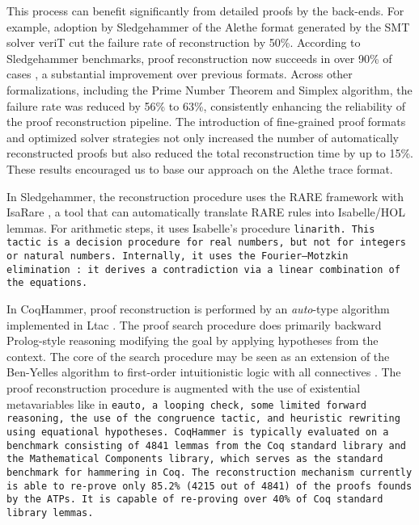 This process can benefit significantly from detailed proofs by the back-ends.
For example, adoption by Sledgehammer of the Alethe format generated by the SMT solver veriT \cite{isabelle1,isabelle2} cut the failure rate of reconstruction by 50\%.
According to Sledgehammer benchmarks, proof reconstruction now succeeds in over 90\% of cases \cite{verit-recon, SledgehammerReconImprove}, a substantial improvement over previous formats.
Across other formalizations, including the Prime Number Theorem and Simplex algorithm, the failure rate was reduced by 56\% to 63\%, consistently enhancing the reliability of the proof reconstruction pipeline.
The introduction of fine-grained proof formats and optimized solver strategies not only increased the number of automatically reconstructed proofs but also reduced the total reconstruction time by up to 15\%.
These results encouraged us to base our approach on the Alethe trace format.

In Sledgehammer, the reconstruction procedure uses the RARE framework with IsaRare \cite{IsaRare}, a tool that can automatically translate RARE rules into Isabelle/HOL lemmas.
For arithmetic steps, it uses Isabelle's procedure \tt{linarith}. This tactic is a decision procedure for real numbers, but not for integers or natural numbers.
Internally, it uses the Fourier–Motzkin elimination \cite{linear-arith-book}: it derives a contradiction via a linear combination of the equations.

In CoqHammer, proof reconstruction is performed by an \emph{auto}-type algorithm implemented in Ltac \cite{ltac}.
The proof search procedure does primarily backward Prolog-style reasoning modifying the goal by applying hypotheses from the context.
The core of the search procedure may be seen as an extension of the Ben-Yelles algorithm to first-order intuitionistic logic with all connectives \cite{urzyczyn_intuitionistic_2016}.
The proof reconstruction procedure is augmented with  the use of existential metavariables like in \tt{eauto}, a looping check, some limited forward reasoning, the use of the \tt{congruence tactic}, and heuristic
rewriting using equational hypotheses.
CoqHammer is typically evaluated on a benchmark consisting of 4841 lemmas from the Coq standard library and the Mathematical Components library, which serves as the standard benchmark for hammering in Coq.
The reconstruction mechanism currently is able to re-prove only 85.2\% (4215 out of 4841) of the proofs founds by the ATPs.
It is capable of re-proving over 40\% of Coq standard library lemmas.


